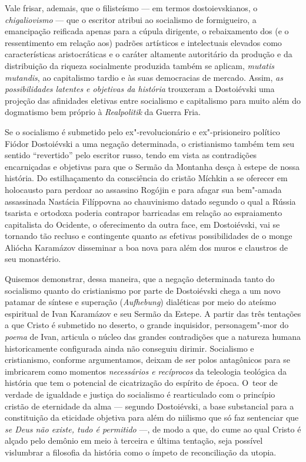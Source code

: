 Vale frisar, ademais, que o filisteísmo --- em termos dostoievskianos, o
\emph{chigaliovismo} --- que o escritor atribui ao socialismo de
formigueiro, a emancipação reificada apenas para a cúpula dirigente, o
rebaixamento dos (e o ressentimento em relação aos) padrões artísticos e
intelectuais elevados como características aristocráticas e o caráter
altamente autoritário da produção e da distribuição da riqueza
socialmente produzida também se aplicam, \emph{mutatis mutandis}, ao
capitalismo tardio e às suas democracias de mercado. Assim, \emph{as
possibilidades latentes e objetivas da história} trouxeram a Dostoiévski
uma projeção das afinidades eletivas entre socialismo e capitalismo para
muito além do dogmatismo bem próprio à \emph{Realpolitik} da Guerra
Fria.

Se o socialismo é submetido pelo ex"-revolucionário e ex"-prisioneiro
político Fiódor Dostoiévski a uma negação determinada, o cristianismo
também tem seu sentido ``revertido'' pelo escritor russo, tendo em vista
as contradições encarniçadas e objetivas para que o Sermão da Montanha
desça à estepe de nossa história. Do estilhaçamento da consciência do
cristão Míchkin a se oferecer em holocausto para perdoar ao assassino
Rogójin e para afagar sua bem"-amada assassinada Nastácia Filíppovna ao
chauvinismo datado segundo o qual a Rússia tsarista e ortodoxa poderia
contrapor barricadas em relação ao espraiamento capitalista do Ocidente,
o oferecimento da outra face, em Dostoiévski, vai se tornando tão
recluso e contingente quanto as efetivas possibilidades de o monge
Aliócha Karamázov disseminar a boa nova para além dos muros e claustros
de seu monastério.

Quisemos demonstrar, dessa maneira, que a negação determinada tanto do
socialismo quanto do cristianismo por parte de Dostoiévski chega a um
novo patamar de síntese e superação (\emph{Aufhebung}) dialéticas por
meio do ateísmo espiritual de Ivan Karamázov e seu Sermão da Estepe. A
partir das três tentações a que Cristo é submetido no deserto, o grande
inquisidor, personagem"-mor do \emph{poema} de Ivan, articula o núcleo
das grandes contradições que a natureza humana historicamente
configurada ainda não conseguiu dirimir. Socialismo e cristianismo,
conforme argumentamos, deixam de ser polos antagônicos para se
imbricarem como momentos \emph{necessários e recíprocos} da teleologia
teológica da história que tem o potencial de cicatrização do espírito de
época. O~teor de verdade de igualdade e justiça do socialismo é
rearticulado com o princípio cristão de eternidade da alma --- segundo
Dostoiévski, a base substancial para a constituição da eticidade
objetiva para além do niilismo que só faz sentenciar que \emph{se Deus
não existe, tudo é permitido} ---, de modo a que, do cume ao qual Cristo
é alçado pelo demônio em meio à terceira e última tentação, seja
possível vislumbrar a filosofia da história como o ímpeto de
reconciliação da utopia.


